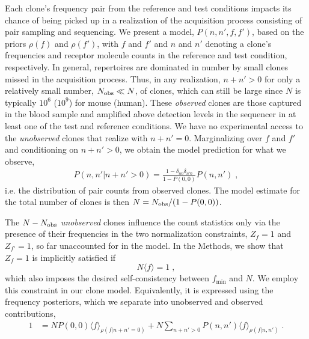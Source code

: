 \documentclass[letterpaper,english,prl,reprint,longbibliography]{revtex4-1} %
\begin{document}
Each clone's frequency pair from the reference and test conditions impacts its chance of being picked up in a realization of the acquisition process consisting of pair sampling and sequencing. 
We present a model, $P(n,n',f,f')$, based on the priors $\rho(f)$ and $\rho(f')$, with $f$ and $f'$ and $n$ and $n'$ denoting a clone's frequencies and receptor molecule counts in the reference and test condition, respectively. In general, repertoires are dominated in number by small clones missed in the acquisition process. Thus, in any realization, $n+n'>0$ for only a relatively small number, $N_{\textrm{\textrm{obs}}}\ll N$, of clones, which can still be large since $N$ is typically $ 10^6$ ($10^9$) for mouse (human). These \emph{observed} clones are those captured in the blood sample and amplified above detection levels in the sequencer in at least one of the test and reference conditions. We have no experimental access to the \emph{unobserved} clones that realize with $n+n'=0$. Marginalizing over $f$ and $f'$ and conditioning on $n+n'>0$, we obtain the model prediction for what we observe, 
\begin{align}
	P(n,n'|n+n'>0)=\frac{1-\delta_{n0}\delta_{n'0}}{1-P(0,0)}P(n,n')\;,
\end{align} 
i.e. the distribution of pair counts from observed clones. The model estimate for the total number of clones is then $N=N_{\textrm{\textrm{obs}}}/(1-P(0,0))$. 

The $N-N_{\textrm{\textrm{obs}}}$ \emph{unobserved} clones influence the count statistics only via the presence of their frequencies in the two normalization constraints, $Z_f=1$ and $Z_{f'}=1$, so far unaccounted for in the model.
In the Methods, we show that $Z_f=1$ is implicitly satisfied if 
\begin{equation}
	N\langle f\rangle=1\;,\label{eq:orignorm}
\end{equation}
which also imposes the desired self-consistency between $f_\textrm{min}$ and $N$. We employ this constraint in our clone model. Equivalently, it is expressed using the frequency posteriors, which we separate into unobserved and observed contributions,
\begin{align*}
	1&= NP(0,0) \langle f\rangle_{\rho(f|n+n'=0)}+	N\sum_{n+n'>0}P(n,n')\langle f\rangle_{\rho(f|n,n')}\;.
\end{align*}
\end{document}
